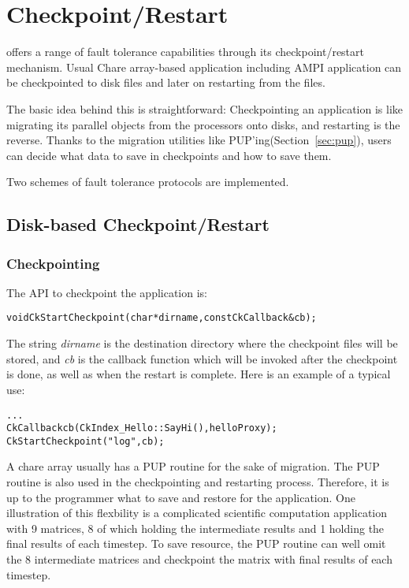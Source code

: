 \section{Checkpoint/Restart}

\label{sec:checkpoint}

\charmpp{} offers a range of fault tolerance capabilities through its 
checkpoint/restart mechanism. Usual Chare array-based \charmpp{} application 
including AMPI application can be checkpointed to disk files and later 
on restarting from the files.

The basic idea behind this is straightforward: Checkpointing an 
application is like migrating its parallel objects from the processors
onto disks, and restarting is the reverse. Thanks to the migration 
utilities like PUP'ing(Section~\ref{sec:pup}), users can decide what 
data to save in checkpoints and how to save them.

Two schemes of fault tolerance protocols are implemented.

\subsection{Disk-based Checkpoint/Restart}

\subsubsection{Checkpointing}

\label{sec:diskcheckpoint}
	The API to checkpoint the application is:

\begin{alltt} 
  void CkStartCheckpoint(char* dirname,const CkCallback& cb);
\end{alltt}

The string {\it dirname} is the destination directory where the checkpoint
files will be stored, and {\it cb} is the callback function which will be
invoked after the checkpoint is done, as well as when the restart is
complete. Here is an example of a typical use:

\begin{alltt} 
  . . .
  CkCallback cb(CkIndex_Hello::SayHi(),helloProxy);
  CkStartCheckpoint("log",cb);
\end{alltt}

A chare array usually has a PUP routine for the sake of migration. 
The PUP routine is also used in the checkpointing and restarting process.
Therefore, it is up to the programmer what to save and restore for
the application. One illustration of this flexbility is a complicated
scientific computation application with 9 matrices, 8 of which holding 
the intermediate results and 1 holding the final results of each timestep.
To save resource, the PUP routine can well omit the 8 intermediate matrices
and checkpoint the matrix with final results of each timestep. 

